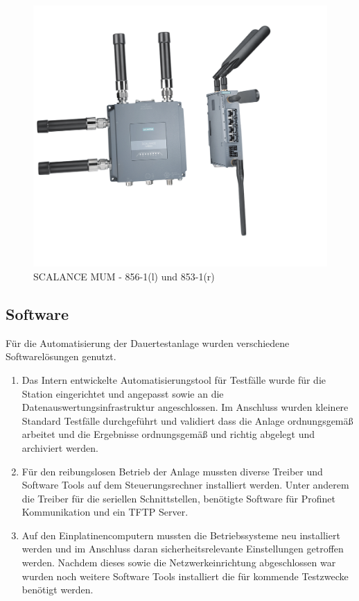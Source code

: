 \begin{figure}[!ht]
        \centering
        \includegraphics[width=\textwidth]{Pictures/MUM_IP65_IP30.png}
        \caption{SCALANCE MUM - 856-1(l) und 853-1(r)}
        \label{SCALANCEMUM}    
\end{figure}

\subsection{Software}
Für die Automatisierung der Dauertestanlage wurden verschiedene Softwarelösungen genutzt. \\
\begin{enumerate}
        \item  Das Intern entwickelte Automatisierungstool für Testfälle wurde für die Station eingerichtet und angepasst sowie an die Datenauswertungsinfrastruktur angeschlossen. Im Anschluss wurden kleinere Standard Testfälle durchgeführt und validiert dass die Anlage ordnungsgemäß arbeitet und die Ergebnisse ordnungsgemäß und richtig abgelegt und archiviert werden. \\
        \item  Für den reibungslosen Betrieb der Anlage mussten diverse Treiber und Software Tools auf dem Steuerungsrechner installiert werden. Unter anderem die Treiber  für die seriellen Schnittstellen, benötigte Software für Profinet Kommunikation und ein TFTP Server. \\
        \item  Auf den Einplatinencomputern mussten die Betriebssysteme neu installiert werden und im Anschluss daran sicherheitsrelevante Einstellungen getroffen werden. Nachdem dieses sowie die Netzwerkeinrichtung abgeschlossen war wurden noch weitere Software Tools installiert die für kommende Testzwecke  benötigt werden. \\
\end{enumerate}

